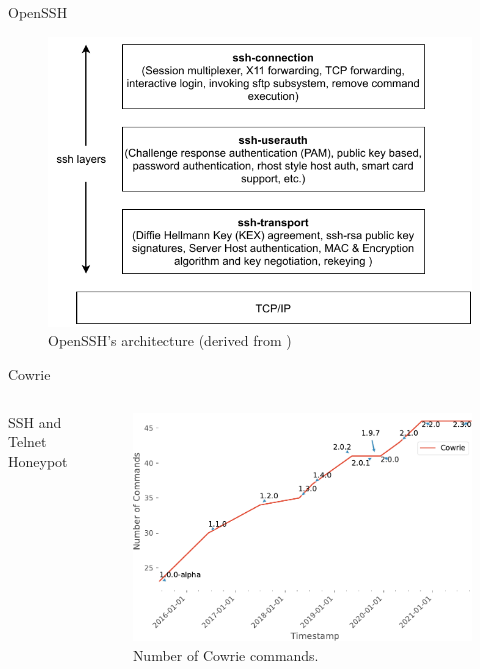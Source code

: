 \begin{frame}{OpenSSH}
    \begin{figure}
        \centering
        \includegraphics[width=0.9\columnwidth]{img/openssh-architecture.pdf}
        \caption[OpenSSH architecture]{
            OpenSSH's architecture (derived from \cite{openssh2007})
        }
    \end{figure}
\end{frame}

\begin{frame}{Cowrie}
    \begin{columns}
        \begin{column}{0.3\textwidth}
            SSH and Telnet Honeypot
        \end{column}
        \begin{column}{0.7\textwidth}
            \begin{figure}
                \centering
                \includegraphics[width=\columnwidth]{img/cowrie-cmd.pdf}
                \caption[Cowrie commands]{
                    Number of Cowrie commands.
                }
            \end{figure}
        \end{column}
    \end{columns}
\end{frame}

